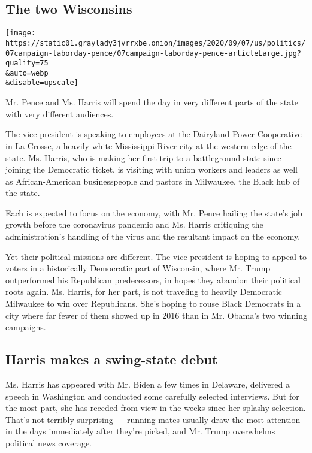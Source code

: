 \hypertarget{the-two-wisconsins}{%
\subsection{The two Wisconsins}\label{the-two-wisconsins}}

\texttt{[image: https://static01.graylady3jvrrxbe.onion/images/2020/09/07/us/politics/07campaign-laborday-pence/07campaign-laborday-pence-articleLarge.jpg?quality=75\\\&auto=webp\\\&disable=upscale]}

Mr. Pence and Ms. Harris will spend the day in very different parts of
the state with very different audiences.

The vice president is speaking to employees at the Dairyland Power
Cooperative in La Crosse, a heavily white Mississippi River city at the
western edge of the state. Ms. Harris, who is making her first trip to a
battleground state since joining the Democratic ticket, is visiting with
union workers and leaders as well as African-American businesspeople and
pastors in Milwaukee, the Black hub of the state.

Each is expected to focus on the economy, with Mr. Pence hailing the
state's job growth before the coronavirus pandemic and Ms. Harris
critiquing the administration's handling of the virus and the resultant
impact on the economy.

Yet their political missions are different. The vice president is hoping
to appeal to voters in a historically Democratic part of Wisconsin,
where Mr. Trump outperformed his Republican predecessors, in hopes they
abandon their political roots again. Ms. Harris, for her part, is not
traveling to heavily Democratic Milwaukee to win over Republicans. She's
hoping to rouse Black Democrats in a city where far fewer of them showed
up in 2016 than in Mr. Obama's two winning campaigns.

\hypertarget{harris-makes-a-swing-state-debut}{%
\subsection{Harris makes a swing-state
debut}\label{harris-makes-a-swing-state-debut}}

Ms. Harris has appeared with Mr. Biden a few times in Delaware,
delivered a speech in Washington and conducted some carefully selected
interviews. But for the most part, she has receded from view in the
weeks since
\href{https://www.nytimes3xbfgragh.onion/2020/08/11/us/politics/kamala-harris-vp-biden.html}{her
splashy selection}. That's not terribly surprising --- running mates
usually draw the most attention in the days immediately after they're
picked, and Mr. Trump overwhelms political news coverage.


